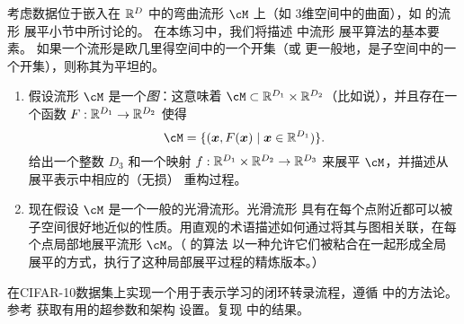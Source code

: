 \documentclass[../../book-main.tex]{subfiles}
\begin{document}
\begin{exercise}[流形展平的概念理解]
  考虑数据位于嵌入在 $\mathbb{R}^D$ 中的弯曲流形 $\cM$ 上（如
  3维空间中的曲面），如  的流形
  展平小节中所讨论的。
  在本练习中，我们将描述 \cite{Psenka-JMLR24} 中流形
  展平算法的基本要素。
  如果一个流形是欧几里得空间中的一个开集（或
  更一般地，是子空间中的一个开集），则称其为平坦的。

  \begin{enumerate}
    \item 假设流形 $\cM$ 是一个\textit{图}：这意味着 $\cM
      \subset \R^{D_1} \times \R^{D_2}$（比如说），并且存在一个函数 $F
      : \mathbb{R}^{D_1} \to \mathbb{R}^{D_2}$ 使得
      \begin{equation}
        \cM = \set{(\x, F(\x) \mid \x \in \R^{D_1})}.
      \end{equation}
      给出一个整数 $D_3$ 和一个映射 $f : \mathbb{R}^{D_1} \times \mathbb{R}^{D_2} \to \mathbb{R}^{D_3}$
      来展平 $\cM$，并描述从展平表示中相应的（无损）
      重构过程。
    \item 现在假设 $\cM$ 是一个一般的光滑流形。光滑流形
      具有在每个点附近都可以被子空间很好地近似的性质。用直观的术语描述如何通过将其与图相关联，在每个点局部地展平流形
      $\cM$。（\cite{Psenka-JMLR24} 的算法
      以一种允许它们被粘合在一起形成全局
      展平的方式，执行了这种局部展平过程的精炼版本。）
  \end{enumerate}
\end{exercise}


\begin{exercise}[复现闭环转录]

  在CIFAR-10数据集上实现一个用于表示学习的闭环转录流程，遵循
   中的方法论。
  参考 \cite{Dai-entropy-2022} 获取有用的超参数和架构
  设置。复现  中的结果。


\end{exercise}
\end{document}
